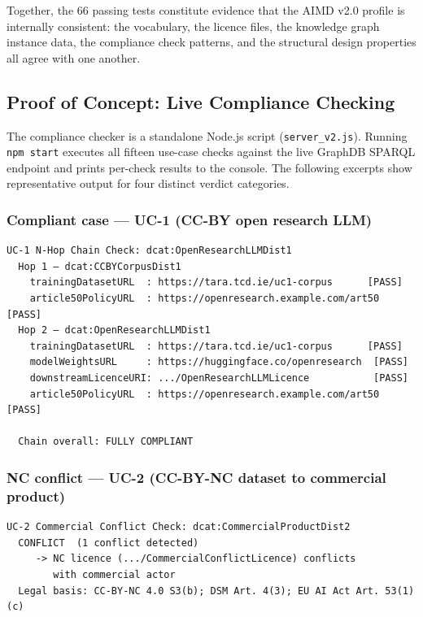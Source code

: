 \documentclass[12pt,a4paper]{article}
\begin{document}
\noindent Together, the 66 passing tests constitute evidence that the AIMD v2.0 profile is internally consistent: the vocabulary, the licence files, the knowledge graph instance data, the compliance check patterns, and the structural design properties all agree with one another.

\subsection{Proof of Concept: Live Compliance Checking}

The compliance checker is a standalone Node.js script (\texttt{server\_v2.js}). Running \texttt{npm start} executes all fifteen use-case checks against the live GraphDB SPARQL endpoint and prints per-check results to the console. The following excerpts show representative output for four distinct verdict categories.

\subsubsection*{Compliant case — UC-1 (CC-BY open research LLM)}

\begin{lstlisting}[language={}]
  UC-1 N-Hop Chain Check: dcat:OpenResearchLLMDist1
  Hop 1 — dcat:CCBYCorpusDist1
    trainingDatasetURL  : https://tara.tcd.ie/uc1-corpus      [PASS]
    article50PolicyURL  : https://openresearch.example.com/art50 [PASS]
  Hop 2 — dcat:OpenResearchLLMDist1
    trainingDatasetURL  : https://tara.tcd.ie/uc1-corpus      [PASS]
    modelWeightsURL     : https://huggingface.co/openresearch  [PASS]
    downstreamLicenceURI: .../OpenResearchLLMLicence           [PASS]
    article50PolicyURL  : https://openresearch.example.com/art50 [PASS]

  Chain overall: FULLY COMPLIANT
\end{lstlisting}

\subsubsection*{NC conflict — UC-2 (CC-BY-NC dataset to commercial product)}

\begin{lstlisting}[language={}]
  UC-2 Commercial Conflict Check: dcat:CommercialProductDist2
  CONFLICT  (1 conflict detected)
     -> NC licence (.../CommercialConflictLicence) conflicts
        with commercial actor
  Legal basis: CC-BY-NC 4.0 S3(b); DSM Art. 4(3); EU AI Act Art. 53(1)(c)
\end{lstlisting}
\end{document}
